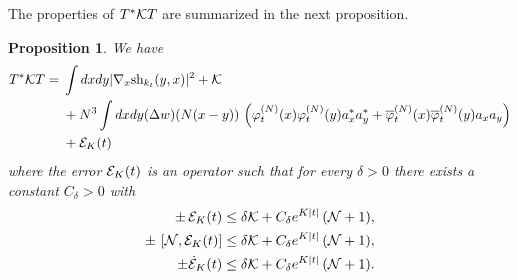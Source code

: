 \documentclass[11pt,a4paper]{article}
\newtheorem{proposition}[thm]{Proposition}
\newcommand{\done}{}
\newcommand{\ech}[2]{#2}	%
\newcommand{\ekt}{e^{K\lvert t\rvert}}	%
\newcommand{\cE}{{\cal E}}
\newcommand{\cK}{{\cal K}}
\newcommand{\cN}{{\cal N}}
\begin{document}
The properties of $T^* \cK T$ are summarized in the next proposition. 
\begin{proposition}\label{prop:TKT}
We have
\begin{equation}\label{eq:pr-K}
\begin{split}
T^* \cK T = \; &  \int dx dy | \nabla_x \text{sh}_{k_t} (y,x) |^2 + \cK  \\
&+ N^3 \int dx dy (\Delta w) (N (x-y)) \, \left(\varphi_t^{(N)} (x) \varphi_t^{(N)} (y)  a_x^* a^*_y + \overline{\varphi}_t^{(N)} (x) \overline{\varphi}_t^{(N)} (y)  a_x a_y  \right) \\
&+ \cE_K (t) 
\end{split} \end{equation}
where the error $\cE_K (t)$ is an operator such that\done{} for every $\delta > 0$ there exists a constant $C_\delta > 0$ with 
\begin{equation}\label{eq:TKT-cl} 
\begin{split} 
\pm \, \cE_K (t) &\leq \delta \cK + C_\delta \ech{\| \varphi_t^{(N)}
\|_{H^2}}{\ekt} \, (\cN + 1), \\
\pm \, \left[ \cN , \cE_K (t) \right] &\leq \delta \cK + C_\delta \ech{\, \|
\varphi_t^{(N)} \|_{H^2}}{\ekt} \, (\cN + 1), \\
\pm \dot{\cE}_K (t) &\leq \delta \cK + C_\delta \ech{\| \varphi_t^{(N)} \|^2_{H^3}}{\ekt} \,  (\cN+1). 
\end{split}
\end{equation}
\end{proposition}
\end{document}
